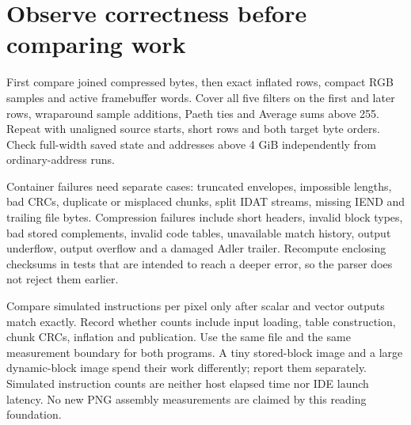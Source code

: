 \section{Observe correctness before comparing work}
First compare joined compressed bytes, then exact inflated rows, compact RGB samples
and active framebuffer words. Cover all five filters on the first and later rows,
wraparound sample additions, Paeth ties and Average sums above 255. Repeat with
unaligned source starts, short rows and both target byte orders. Check full-width
saved state and addresses above 4 GiB independently from ordinary-address runs.

Container failures need separate cases: truncated envelopes, impossible lengths,
bad CRCs, duplicate or misplaced chunks, split IDAT streams, missing IEND and trailing
file bytes. Compression failures include short headers, invalid block types, bad
stored complements, invalid code tables, unavailable match history, output underflow,
output overflow and a damaged Adler trailer. Recompute enclosing checksums in tests
that are intended to reach a deeper error, so the parser does not reject them earlier.

Compare simulated instructions per pixel only after scalar and vector outputs match
exactly. Record whether counts include input loading, table construction, chunk CRCs,
inflation and publication. Use the same file and the same measurement boundary for
both programs. A tiny stored-block image and a large dynamic-block image spend their
work differently; report them separately. Simulated instruction counts are neither
host elapsed time nor IDE launch latency. No new PNG assembly measurements are
claimed by this reading foundation.
